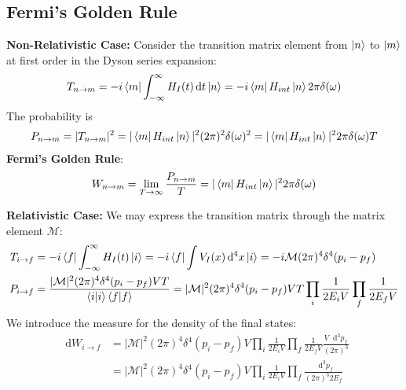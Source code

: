 \documentclass[12pt]{article}
\newcommand{\diff}{\mathop{}\!\mathrm{d}}
\theoremstyle{definition}
\begin{document}
\subsection{Fermi's Golden Rule}
\textbf{Non-Relativistic Case:}
Consider the transition matrix element from $\ket{n}$ to $\ket{m}$ at first order in the Dyson series expansion:
\begin{equation*}
    T_{n \to m} = -i \bra{m} \int_{-\infty}^\infty H_I(t) \diff t \ket{n} = -i \bra{m} H_{int} \ket{n} 2\pi\delta(\omega)
\end{equation*}
The probability is
\begin{equation*}
\begin{split}
    P_{n \to m}
        &= |T_{n \to m}|^2 = |\bra{m} H_{int} \ket{n}|^2 (2\pi)^2 \delta(\omega)^2 = |\bra{m} H_{int} \ket{n}|^2 2\pi\delta(\omega) T \\
\end{split}
\end{equation*}
\textbf{Fermi's Golden Rule}:
\begin{equation*}
    W_{n \to m} = \lim_{T \to \infty} \frac{P_{n \to m}}{T} = |\bra{m} H_{int} \ket{n}|^2 2\pi\delta(\omega)
\end{equation*}

\textbf{Relativistic Case:}
We may express the transition matrix through the matrix element $\mathcal{M}$:
\begin{equation*}
\begin{split}
    T_{i \to f}
        &= -i \bra{f} \int_{-\infty}^\infty H_I(t) \ket{i} = -i \bra{f} \int V_I(x) \diff^4 x \ket{i} = -i \mathcal{M} (2\pi)^4 \delta^4(p_i - p_f) \\
    P_{i \to f}
        &= \frac{|\mathcal{M}|^2 (2\pi)^4 \delta^4(p_i - p_f) V T}{\braket{i|i} \braket{f|f}} = |\mathcal{M}|^2 (2\pi)^4 \delta^4(p_i - p_f) V T \prod_{i} \frac{1}{2E_i V} \prod_{f} \frac{1}{2E_f V} \\
\end{split}
\end{equation*}
We introduce the measure for the density of the final states:
\begin{equation*}
\begin{split}
    \diff W_{i \to f}
        &= |\mathcal{M}|^2 (2\pi)^4 \delta^4(p_i - p_f) V \prod_i \frac{1}{2E_i V} \prod_f \frac{1}{2E_f V} \frac{V \diff^3 p_f}{(2\pi)^3} \\
        &= |\mathcal{M}|^2 (2\pi)^4 \delta^4(p_i - p_f) V \prod_i \frac{1}{2E_i V} \prod_f \frac{\diff^3 p_f}{(2\pi)^3 2E_f} \\
\end{split}
\end{equation*}
\end{document}
